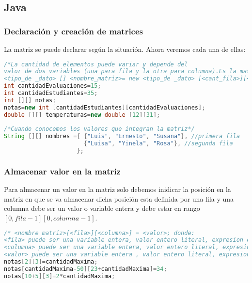 \subsection{Java}

\subsubsection{Declaración y creación de matrices}

La matriz se puede declarar según la situación. Ahora veremos cada una de ellas:

\begin{lstlisting}[language=Java]
/*La cantidad de elementos puede variar y depende del 
valor de dos variables (una para fila y la otra para columna).Es la mas usada
<tipo_de _dato> [] <nombre_matriz>= new <tipo_de _dato> [<cant_fila>][<cant_columna>];*/
int cantidadEvaluaciones=15;
int cantidadEstudiantes=35;
int [][] notas;
notas=new int [cantidadEstudiantes][cantidadEvaluaciones]; 
double [][] temperaturas=new double [12][31];
	
/*Cuando conocemos los valores que integran la matriz*/
String [][] nombres ={ {"Luis", "Ernesto", "Susana"}, //primera fila
                       {"Luisa", "Yinela", "Rosa"}, //segunda fila
                     };
\end{lstlisting}

\subsubsection{Almacenar valor en la matriz}

Para almacenar un valor en la matriz solo debemos inidicar la posición en la matriz en que se va almacenar dicha posición esta definida por una fila y una columna debe ser un valor o variable entera y debe estar en rango $[0,fila-1][0,columna-1]$.

\begin{lstlisting}[language=Java]
/* <nombre matriz>[<fila>][<columna>] = <valor>; donde:
<fila> puede ser una variable entera, valor entero literal, expresion cuyo resultado sea entero e indicada la fila a la que quiero acceder en la matriz
<columna> puede ser una variable entera, valor entero literal, expresion cuyo resultado sea entero e indicada la columna a la que quiero acceder en la matriz 
<valor> puede ser una variable entera , valor entero literal, expresion cuyo resultado sea entero */
notas[2][3]=cantidadMaxima;
notas[cantidadMaxima-50][23+cantidadMaxima]=34;
notas[10+5][3]=2*cantidadMaxima;
\end{lstlisting}

